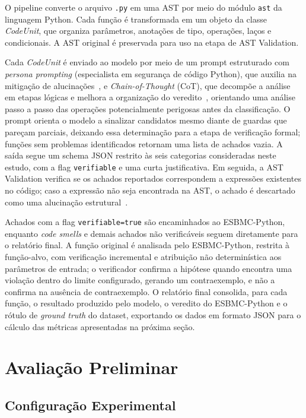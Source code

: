\documentclass[sigconf]{acmart}
\begin{document}
O pipeline converte o arquivo \texttt{.py} em uma AST por meio do módulo
\texttt{ast} da linguagem Python. Cada função é transformada em um objeto da classe \emph{CodeUnit}, que
organiza parâmetros, anotações de tipo, operações, laços e condicionais. A AST original é preservada para uso na etapa de
AST Validation.

Cada \emph{CodeUnit} é enviado ao modelo por meio de um prompt estruturado
com \emph{persona prompting} (especialista em segurança de código Python),
que auxilia na mitigação de alucinações~\cite{ullah2024secllmholmes}, e
\emph{Chain-of-Thought} (CoT), que decompõe a análise em etapas lógicas e
melhora a organização do
veredito~\cite{ullah2024secllmholmes,souza2026beyondstrictrules,tihanyi2025vulnerability},
orientando uma análise passo a passo das
operações potencialmente perigosas antes da classificação. O prompt orienta
o modelo a sinalizar candidatos mesmo diante de guardas que pareçam
parciais, deixando essa determinação para a etapa de verificação formal;
funções sem problemas identificados retornam uma lista de achados vazia. A
saída segue um schema JSON restrito às seis categorias consideradas neste
estudo, com a flag \texttt{verifiable} e uma curta justificativa. Em
seguida, a AST Validation verifica se os achados reportados correspondem a
expressões existentes no código; caso a expressão não seja encontrada na
AST, o achado é descartado como uma alucinação estrutural~\cite{khati2026forge}.

Achados com a flag \texttt{verifiable=true} são encaminhados ao
ESBMC-Python, enquanto \textit{code smells} e demais achados não
verificáveis seguem diretamente para o relatório final. A função original é
analisada pelo ESBMC-Python, restrita à função-alvo, com verificação
incremental e atribuição não determinística aos parâmetros de entrada; o
verificador confirma a hipótese quando encontra uma violação dentro do
limite configurado, gerando um contraexemplo, e não a confirma na ausência
de contraexemplo. O relatório final consolida, para cada função, o
resultado produzido pelo modelo, o veredito do ESBMC-Python e o rótulo de
\textit{ground truth} do dataset, exportando os dados em formato JSON para
o cálculo das métricas apresentadas na próxima seção.






\section{Avaliação Preliminar}
\subsection{Configuração Experimental}
\end{document}
